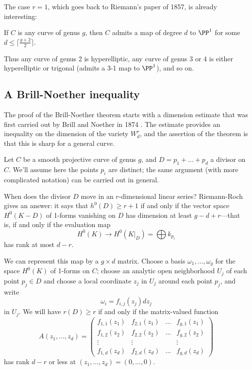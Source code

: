 The case $r=1$, which goes back to Riemann's paper of 1857, is already interesting:

\begin{corollary}
If $C$ is any curve of genus $g$, then $C$ admits a map of degree $d$ to $\PP^1$ for some $d \leq \lceil \frac{g+2}{2}\rceil$.
\end{corollary}

Thus any curve of genus 2 is hyperelliptic, any curve of genus 3 or 4 is either hyperelliptic or trigonal  (admits a 3-1 map to $\PP^1$), and so on.


\subsection{A Brill-Noether inequality}

The proof of the Brill-Noether theorem starts with a dimension estimate that was first carried out by Brill and Noether in 1874 \cite{Brill-NoetherOriginal}. The estimate provides an inequality on the dimension
of the variety $W^r_d$, and the assertion of the theorem is that this is sharp for a general curve.


Let $C$ be a smooth projective curve of genus $g$, and $D = p_1 + \dots + p_d$ a divisor on $C$. We'll assume here the points $p_i$ are distinct; the same argument (with  more complicated notation) can be carried out in general.

When does the divisor $D$ move in an $r$-dimensional linear series? Riemann-Roch gives an answer: it says that $h^0(D) \geq r+1$ if and only if the vector space $H^0(K-D)$ of 1-forms vanishing on $D$ has dimension at least $g-d+r$---that is, if and only if the  evaluation map
$$
H^0(K) \to H^0(K|_D) = \bigoplus k_{p_i}
$$
has rank at most $d-r$. 

We can represent this map by a $g \times d$ matrix. Choose a basis $\omega_1,\dots,\omega_g$ for the space $H^0(K)$ of 1-forms on $C$; choose an analytic open neighborhood $U_j$ of each point $p_j \in D$ and choose a local coordinate $z_j$ in $U_j$ around each point $p_j$, and write
$$
\omega_i = f_{i,j}(z_j)dz_j
$$
in $U_j$. We will have $r(D) \geq r$ if and only if the  matrix-valued function
$$
A(z_1,\dots,z_d) = 
\begin{pmatrix}
f_{1,1}(z_1) & f_{2,1}(z_1) & \dots & f_{g,1}(z_1) \\
f_{1,2}(z_2) & f_{2,2}(z_2) & \dots & f_{g,2}(z_2) \\
\vdots & \vdots &  & \vdots \\
f_{1,d}(z_d) & f_{2,d}(z_d) & \dots & f_{g,d} (z_d)
\end{pmatrix}
$$
has rank $d-r$ or less at $(z_1,\dots,z_d) = (0,\dots,0)$.

